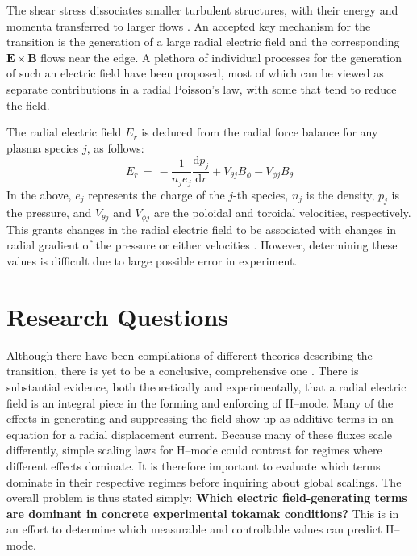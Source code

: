 The shear stress dissociates smaller turbulent structures, with their energy and momenta transferred to larger flows \cite{staps_backstepping_2017}.
An accepted key mechanism for the transition is the generation of a large radial electric field and the corresponding $\mathbf{E}\times\mathbf{B}$ flows near the edge.
A plethora of individual processes for the generation of such an electric field have been proposed, most of which can be viewed as separate contributions in a radial Poisson's law, with some that tend to reduce the field.

The radial electric field $E_r$ is deduced from the radial force balance for any plasma species $j$, as follows:
\begin{equation}
	E_r \,=\, -\frac{1}{n_j e_j} \frac{\text{d} p_j}{\text{d} r} + V_{\theta j} B_\phi - V_{\phi j} B_\theta
	\label{eq:E_r}
\end{equation}
In the above, $e_j$ represents the charge of the $j$-th species, $n_j$ is the density, $p_j$ is the pressure, and $V_{\theta j}$ and $V_{\phi j}$ are the poloidal and toroidal velocities, respectively.
This grants changes in the radial electric field to be associated with changes in radial gradient of the pressure or either velocities \cite{connor_review_2000}\cite{staps_backstepping_2017}.
However, determining these values is difficult due to large possible error in experiment.

\section{Research Questions}\label{sec:research_questions}
Although there have been compilations of different theories describing the transition, there is yet to be a conclusive, comprehensive one \cite{connor_review_2000}.
There is substantial evidence, both theoretically and experimentally, that a radial electric field is an integral piece in the forming and enforcing of H--mode.
Many of the effects in generating and suppressing the field show up as additive terms in an equation for a radial displacement current.
Because many of these fluxes scale differently, simple scaling laws for H--mode could contrast for regimes where different effects dominate.
It is therefore important to evaluate which terms dominate in their respective regimes before inquiring about global scalings.
The overall problem is thus stated simply: \textbf{Which electric field-generating terms are dominant in concrete experimental tokamak conditions?}
This is in an effort to determine which measurable and controllable values can predict H--mode.

